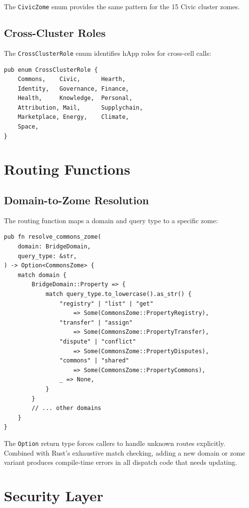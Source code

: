 \documentclass[11pt,twocolumn]{article}
\begin{document}
The \texttt{CivicZome} enum provides the same pattern for the 15 Civic
cluster zomes.

\subsection{Cross-Cluster Roles}

The \texttt{CrossClusterRole} enum identifies hApp roles for cross-cell calls:

\begin{lstlisting}
pub enum CrossClusterRole {
    Commons,    Civic,      Hearth,
    Identity,   Governance, Finance,
    Health,     Knowledge,  Personal,
    Attribution, Mail,      Supplychain,
    Marketplace, Energy,    Climate,
    Space,
}
\end{lstlisting}

\section{Routing Functions}

\subsection{Domain-to-Zome Resolution}

The routing function maps a domain and query type to a specific zome:

\begin{lstlisting}
pub fn resolve_commons_zome(
    domain: BridgeDomain,
    query_type: &str,
) -> Option<CommonsZome> {
    match domain {
        BridgeDomain::Property => {
            match query_type.to_lowercase().as_str() {
                "registry" | "list" | "get"
                    => Some(CommonsZome::PropertyRegistry),
                "transfer" | "assign"
                    => Some(CommonsZome::PropertyTransfer),
                "dispute" | "conflict"
                    => Some(CommonsZome::PropertyDisputes),
                "commons" | "shared"
                    => Some(CommonsZome::PropertyCommons),
                _ => None,
            }
        }
        // ... other domains
    }
}
\end{lstlisting}

The \texttt{Option} return type forces callers to handle unknown routes
explicitly. Combined with Rust's exhaustive match checking, adding a new
domain or zome variant produces compile-time errors in all dispatch code
that needs updating.

\section{Security Layer}
\end{document}
